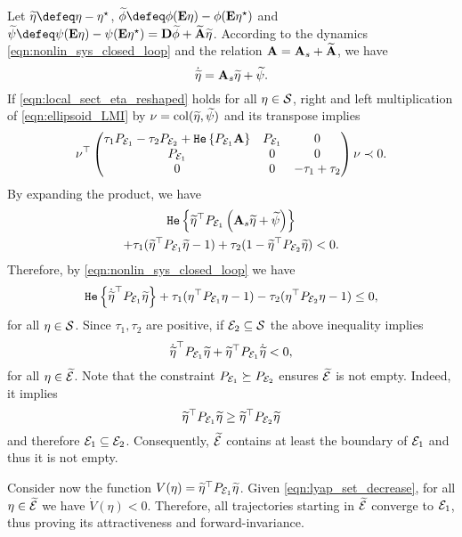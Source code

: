 \documentclass{ifacconf}
\begin{document}
{
\label{sec:proof_prp2}
Let $\widetilde \eta \defeq \eta-\eta^\star$, $\widetilde \phi \defeq \phi(\bE\eta)-\phi(\bE\eta^\star)$ and $\widetilde \psi \defeq \psi(\bE\eta)-\psi(\bE\eta^\star) = \bD\widetilde \phi + \widetilde \bA\widetilde \eta $.
According to the dynamics \eqref{eqn:nonlin_sys_closed_loop} and the relation ${\bf{A}}={\bf{A}}_s+\widetilde{{\bf{A}}}$, we have
\[
\dot{\widetilde\eta} = {\bf{A}}_s\widetilde \eta +\widetilde \psi.
\]
If \eqref{eqn:local_sect_eta_reshaped} holds for all $\eta\in{\mathcal{S}}$, right and left multiplication of \eqref{eqn:ellipsoid_LMI} by $\nu=\operatorname{col}(\widetilde \eta,\widetilde\psi)$ and its transpose implies
\[
    \nu^\top\left(\begin{matrix}\tau_1 P_{{\mathcal{E}}_1}-\tau_2 P_{{\mathcal{E}}_2}+ \texttt{\relax{He}}\left\{{P_{{\mathcal{E}}_1} {\bf{A}}}\right\}  & P_{{\mathcal{E}}_1}   & 0\\P_{{\mathcal{E}}_1}  & 0 &0\\
    0 & 0 & -\tau_1+\tau_2 \end{matrix}\right)\nu\prec 0.
\]
By expanding the product, we have
\begin{multline*} 
\texttt{\relax{He}}\left\{{\widetilde \eta^\top  P_{{\mathcal{E}}_1} \left({\bf{A}}_s\widetilde \eta +  \widetilde\psi\right)}\right\}  \\+\tau_1 (\widetilde\eta^\top P_{{\mathcal{E}}_1}\widetilde\eta-1) + \tau_2 (1-\widetilde\eta^\top P_{{\mathcal{E}}_2}\widetilde\eta)< 0.
\end{multline*}
Therefore,  by \eqref{eqn:nonlin_sys_closed_loop} we have 
\begin{equation*}
    \texttt{\relax{He}}\left\{{\dot {\widetilde \eta}^\top P_{{\mathcal{E}}_1} \widetilde \eta}\right\} +\tau_1 (\eta^\top P_{{\mathcal{E}}_1}\eta-1)- \tau_2 (\eta^\top P_{{\mathcal{E}}_2}\eta-1) \le 0,
\end{equation*}
for all $\eta\in{\mathcal{S}}$.
Since $\tau_1,\tau_2$ are positive, if ${\mathcal{E}}_2\subseteq{\mathcal{S}}$
the above inequality implies
\begin{equation}\label{eqn:lyap_set_decrease}
    \dot {\widetilde \eta}^\top P_{{\mathcal{E}}_1}\widetilde \eta + \widetilde\eta^\top P_{{\mathcal{E}}_1} \dot {\widetilde \eta}< 0,
\end{equation}
for all $\eta\in \widetilde{{\mathcal{E}}}$. 
Note that the constraint $ P_{{\mathcal{E}}_1}\succeq  P_{{\mathcal{E}}_2}$ ensures $\widetilde{{\mathcal{E}}}$ is not empty. Indeed, it implies 
\[\widetilde\eta^\top  P_{{\mathcal{E}}_1}\widetilde\eta \ge \widetilde\eta^\top  P_{{\mathcal{E}}_2}\widetilde\eta 
\]
and therefore 
${\mathcal{E}}_1\subseteq {\mathcal{E}}_2$.
Consequently, $\widetilde{{\mathcal{E}}}$ contains at least the boundary of ${\mathcal{E}}_1$ and thus it is not empty.

Consider now the function $V(\eta)=\widetilde\eta^\top P_{{\mathcal{E}}_1} \widetilde\eta$.  Given \eqref{eqn:lyap_set_decrease}, for all $\eta \in \widetilde{{\mathcal{E}}}$ we have $\dot V(\eta) < 0$. Therefore, all trajectories starting in $\widetilde{{\mathcal{E}}}$ converge to ${\mathcal{E}}_1$, thus proving its attractiveness and forward-invariance.}
\end{document}
